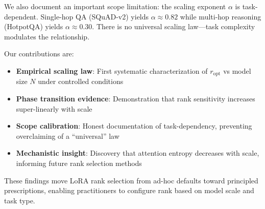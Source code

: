 We also document an important scope limitation: the scaling exponent $\alpha$ is task-dependent. Single-hop QA (SQuAD-v2) yields $\alpha \approx 0.82$ while multi-hop reasoning (HotpotQA) yields $\alpha \approx 0.30$. There is no universal scaling law---task complexity modulates the relationship.

Our contributions are:

\begin{itemize}
    \item \textbf{Empirical scaling law}: First systematic characterization of $r_{\text{opt}}$ vs model size $N$ under controlled conditions
    \item \textbf{Phase transition evidence}: Demonstration that rank sensitivity increases super-linearly with scale
    \item \textbf{Scope calibration}: Honest documentation of task-dependency, preventing overclaiming of a ``universal'' law
    \item \textbf{Mechanistic insight}: Discovery that attention entropy decreases with scale, informing future rank selection methods
\end{itemize}

These findings move LoRA rank selection from ad-hoc defaults toward principled prescriptions, enabling practitioners to configure rank based on model scale and task type.
